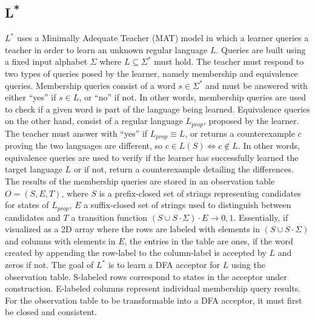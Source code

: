 \subsection{L\textsuperscript{*}}
$L^*$ uses a Minimally Adequate Teacher (MAT) model in which a learner queries a teacher in order to learn an unknown regular language $L$. Queries are built using a fixed input alphabet $\Sigma$ where $L \subseteq \Sigma^*$ must hold. The teacher must respond to two types of queries posed by the learner, namely membership and equivalence queries. Membership queries consist of a word $s \in \Sigma^*$ and must be answered with either ``yes'' if $s \in L$, or ``no'' if not. In other words, membership queries are used to check if a given word is part of the language being learned. Equivalence queries on the other hand, consist of a regular language $L_{prop}$, proposed by the learner. The teacher must answer with  ``yes'' if $L_{prop} \equiv L$, or returns a counterexample $c$ proving the two languages are different, so $c \in L(S) \iff c \notin L$. In other words, equivalence queries are used to verify if the learner has successfully learned the target language $L$ or if not, return a counterexample detailing the differences. The results of the membership queries are stored in an observation table $O = (S,E,T)$, where $S$ is a prefix-closed set of strings representing candidates for states of $L_{prop}$, $E$ a suffix-closed set of strings used to distinguish between candidates and $T$ a transition function $(S \cup S \cdot \Sigma) \cdot E \rightarrow {0,1}$. Essentially, if visualized as a 2D array where the rows are labeled with elements in $(S \cup S \cdot \Sigma)$ and columns with elements in $E$, the entries in the table are ones, if the word created by appending the row-label to the column-label is accepted by $L$ and zeros if not. 
The goal of $L^*$ is to learn a DFA acceptor for $L$ using the observation table. S-labeled rows correspond to states in the acceptor under construction. E-labeled columns represent individual membership query results. For the observation table to be transformable into a DFA acceptor, it must first be closed and consistent.


